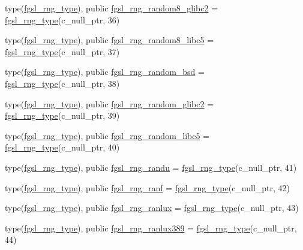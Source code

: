 \begin{DoxyCompactItemize}
type(\hyperlink{structfgsl_1_1fgsl__rng__type}{fgsl\+\_\+rng\+\_\+type}), public \hyperlink{namespacefgsl_a6028caefc0e3a940d1ee57801f7fd438}{fgsl\+\_\+rng\+\_\+random8\+\_\+glibc2} = \hyperlink{structfgsl_1_1fgsl__rng__type}{fgsl\+\_\+rng\+\_\+type}(c\+\_\+null\+\_\+ptr, 36)
\item 
type(\hyperlink{structfgsl_1_1fgsl__rng__type}{fgsl\+\_\+rng\+\_\+type}), public \hyperlink{namespacefgsl_a2cce36d84f84109ec9e54bd0d252bbb3}{fgsl\+\_\+rng\+\_\+random8\+\_\+libc5} = \hyperlink{structfgsl_1_1fgsl__rng__type}{fgsl\+\_\+rng\+\_\+type}(c\+\_\+null\+\_\+ptr, 37)
\item 
type(\hyperlink{structfgsl_1_1fgsl__rng__type}{fgsl\+\_\+rng\+\_\+type}), public \hyperlink{namespacefgsl_a087022fa0d8a304cfb59e544a14d0a3c}{fgsl\+\_\+rng\+\_\+random\+\_\+bsd} = \hyperlink{structfgsl_1_1fgsl__rng__type}{fgsl\+\_\+rng\+\_\+type}(c\+\_\+null\+\_\+ptr, 38)
\item 
type(\hyperlink{structfgsl_1_1fgsl__rng__type}{fgsl\+\_\+rng\+\_\+type}), public \hyperlink{namespacefgsl_aa5b21e91890ada1ae4bef30981f67da1}{fgsl\+\_\+rng\+\_\+random\+\_\+glibc2} = \hyperlink{structfgsl_1_1fgsl__rng__type}{fgsl\+\_\+rng\+\_\+type}(c\+\_\+null\+\_\+ptr, 39)
\item 
type(\hyperlink{structfgsl_1_1fgsl__rng__type}{fgsl\+\_\+rng\+\_\+type}), public \hyperlink{namespacefgsl_a642018575871b9b658058f7540ffce03}{fgsl\+\_\+rng\+\_\+random\+\_\+libc5} = \hyperlink{structfgsl_1_1fgsl__rng__type}{fgsl\+\_\+rng\+\_\+type}(c\+\_\+null\+\_\+ptr, 40)
\item 
type(\hyperlink{structfgsl_1_1fgsl__rng__type}{fgsl\+\_\+rng\+\_\+type}), public \hyperlink{namespacefgsl_a27e0ade0cf0e6155c944ca520547c4a8}{fgsl\+\_\+rng\+\_\+randu} = \hyperlink{structfgsl_1_1fgsl__rng__type}{fgsl\+\_\+rng\+\_\+type}(c\+\_\+null\+\_\+ptr, 41)
\item 
type(\hyperlink{structfgsl_1_1fgsl__rng__type}{fgsl\+\_\+rng\+\_\+type}), public \hyperlink{namespacefgsl_a40a3682ade652628973e925312f78240}{fgsl\+\_\+rng\+\_\+ranf} = \hyperlink{structfgsl_1_1fgsl__rng__type}{fgsl\+\_\+rng\+\_\+type}(c\+\_\+null\+\_\+ptr, 42)
\item 
type(\hyperlink{structfgsl_1_1fgsl__rng__type}{fgsl\+\_\+rng\+\_\+type}), public \hyperlink{namespacefgsl_a52505d0b341c829d785f2a0005575a40}{fgsl\+\_\+rng\+\_\+ranlux} = \hyperlink{structfgsl_1_1fgsl__rng__type}{fgsl\+\_\+rng\+\_\+type}(c\+\_\+null\+\_\+ptr, 43)
\item 
type(\hyperlink{structfgsl_1_1fgsl__rng__type}{fgsl\+\_\+rng\+\_\+type}), public \hyperlink{namespacefgsl_a1403f9766b272caac077f138b24156ba}{fgsl\+\_\+rng\+\_\+ranlux389} = \hyperlink{structfgsl_1_1fgsl__rng__type}{fgsl\+\_\+rng\+\_\+type}(c\+\_\+null\+\_\+ptr, 44)

\end{DoxyCompactItemize}

